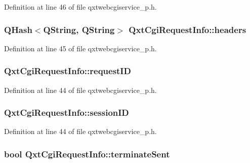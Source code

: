 Definition at line 46 of file qxtwebcgiservice\-\_\-p.\-h.

\hypertarget{struct_qxt_cgi_request_info_ab890abe88b84d3aa7ccedeabbeda079f}{
\subsubsection[{headers}]{\setlength{\rightskip}{0pt plus 5cm}Q\-Hash$<${\bf Q\-String}, {\bf Q\-String}$>$ Qxt\-Cgi\-Request\-Info\-::headers}}\label{struct_qxt_cgi_request_info_ab890abe88b84d3aa7ccedeabbeda079f}


Definition at line 45 of file qxtwebcgiservice\-\_\-p.\-h.

\hypertarget{struct_qxt_cgi_request_info_a5626af924480e446660a8138be500f1a}{
\subsubsection[{request\-I\-D}]{ Qxt\-Cgi\-Request\-Info\-::request\-I\-D}}\label{struct_qxt_cgi_request_info_a5626af924480e446660a8138be500f1a}


Definition at line 44 of file qxtwebcgiservice\-\_\-p.\-h.

\hypertarget{struct_qxt_cgi_request_info_a0820031644e83635f3ba55bccd269c13}{
\subsubsection[{session\-I\-D}]{ Qxt\-Cgi\-Request\-Info\-::session\-I\-D}}\label{struct_qxt_cgi_request_info_a0820031644e83635f3ba55bccd269c13}


Definition at line 44 of file qxtwebcgiservice\-\_\-p.\-h.

\hypertarget{struct_qxt_cgi_request_info_a7c807ef728ade620a4625679532e0324}{
\subsubsection[{terminate\-Sent}]{\setlength{\rightskip}{0pt plus 5cm}bool Qxt\-Cgi\-Request\-Info\-::terminate\-Sent}}\label{struct_qxt_cgi_request_info_a7c807ef728ade620a4625679532e0324}


